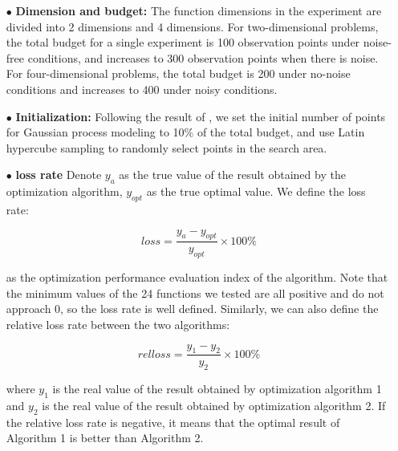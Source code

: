 \documentclass{article}
\begin{document}
\begin{itemize}
\item[$\bullet$] \textbf{Dimension and budget:} The function dimensions in the experiment are divided into 2 dimensions and 4 dimensions. For two-dimensional problems, the total budget for a single experiment is 100 observation points under noise-free conditions, and increases to 300 observation points when there is noise. For four-dimensional problems, the total budget is 200 under no-noise conditions and increases to 400 under noisy conditions.
\item[$\bullet$] \textbf{Initialization:} Following the result of \citep{Bossek2020Initial}, we set the initial number of points for Gaussian process modeling to 10$\%$ of the total budget, and use Latin hypercube sampling to randomly select points in the search area.
\item[$\bullet$] \textbf{loss rate} Denote $y_a$ as the true value of the result obtained by the optimization algorithm, $y_{opt}$ as the true optimal value. We define the loss rate:

\begin{equation}\label{eq9}
	loss = \frac{y_a - y_{opt}}{y_{opt}}\times 100\%
\end{equation}

 as the optimization performance evaluation index of the algorithm. Note that the minimum values of the 24 functions we tested are all positive and do not approach 0, so the loss rate is well defined. Similarly, we can also define the relative loss rate between the two algorithms:

\begin{equation}\label{eq10}
	relloss = \frac{y_1 - y_2}{y_2}\times 100\%
\end{equation}
  
 where $y_1$ is the real value of the result obtained by optimization algorithm 1 and $y_2$ is the real value of the result obtained by optimization algorithm 2. If the relative loss rate is negative, it means that the optimal result of Algorithm 1 is better than Algorithm 2.


\end{itemize}
\end{document}
